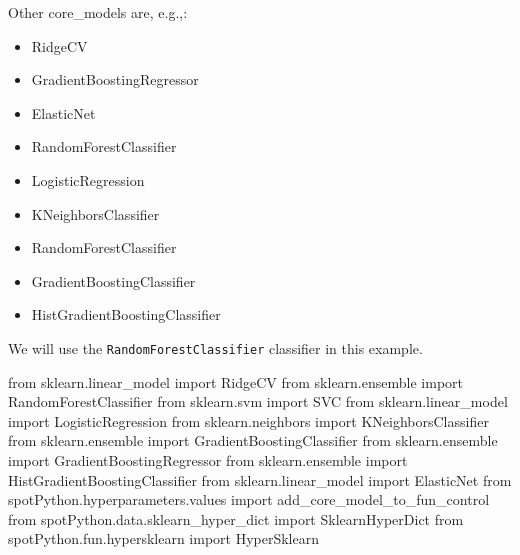 \documentclass[
  letterpaper,
  DIV=11,
  numbers=noendperiod]{scrreprt}
\newenvironment{Shaded}{\begin{snugshade}}{\end{snugshade}}
\newcommand{\ImportTok}[1]{\textcolor[rgb]{0.00,0.46,0.62}{#1}}
\newcommand{\NormalTok}[1]{\textcolor[rgb]{0.00,0.23,0.31}{#1}}
\providecommand{\tightlist}{%
  \setlength{\itemsep}{0pt}\setlength{\parskip}{0pt}}\usepackage{longtable,booktabs,array}
\begin{document}
Other core\_models are, e.g.,:

\begin{itemize}
\tightlist
\item
  RidgeCV
\item
  GradientBoostingRegressor
\item
  ElasticNet
\item
  RandomForestClassifier
\item
  LogisticRegression
\item
  KNeighborsClassifier
\item
  RandomForestClassifier
\item
  GradientBoostingClassifier
\item
  HistGradientBoostingClassifier
\end{itemize}

We will use the \texttt{RandomForestClassifier} classifier in this
example.

\begin{Shaded}
\begin{Highlighting}[]
\ImportTok{from}\NormalTok{ sklearn.linear\_model }\ImportTok{import}\NormalTok{ RidgeCV}
\ImportTok{from}\NormalTok{ sklearn.ensemble }\ImportTok{import}\NormalTok{ RandomForestClassifier}
\ImportTok{from}\NormalTok{ sklearn.svm }\ImportTok{import}\NormalTok{ SVC}
\ImportTok{from}\NormalTok{ sklearn.linear\_model }\ImportTok{import}\NormalTok{ LogisticRegression}
\ImportTok{from}\NormalTok{ sklearn.neighbors }\ImportTok{import}\NormalTok{ KNeighborsClassifier}
\ImportTok{from}\NormalTok{ sklearn.ensemble }\ImportTok{import}\NormalTok{ GradientBoostingClassifier}
\ImportTok{from}\NormalTok{ sklearn.ensemble }\ImportTok{import}\NormalTok{ GradientBoostingRegressor}
\ImportTok{from}\NormalTok{ sklearn.ensemble }\ImportTok{import}\NormalTok{ HistGradientBoostingClassifier}
\ImportTok{from}\NormalTok{ sklearn.linear\_model }\ImportTok{import}\NormalTok{ ElasticNet}
\ImportTok{from}\NormalTok{ spotPython.hyperparameters.values }\ImportTok{import}\NormalTok{ add\_core\_model\_to\_fun\_control}
\ImportTok{from}\NormalTok{ spotPython.data.sklearn\_hyper\_dict }\ImportTok{import}\NormalTok{ SklearnHyperDict}
\ImportTok{from}\NormalTok{ spotPython.fun.hypersklearn }\ImportTok{import}\NormalTok{ HyperSklearn}
\end{Highlighting}
\end{Shaded}
\end{document}

